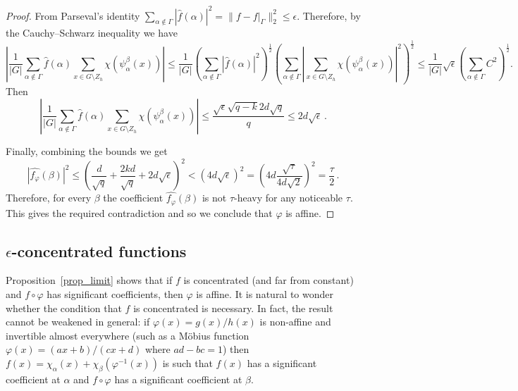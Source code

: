 \documentclass[11pt]{article}
\theoremstyle{definition}
\begin{document}
\begin{proof}
    From Parseval's identity $\sum_{\alpha \notin \Gamma} \left| \widehat{f}(\alpha) \right|^2 = \|f - f|_\Gamma \|_{2}^{2} \leq \epsilon$. Therefore, by the Cauchy--Schwarz inequality we have
    \[
        \left| \frac{1}{|G|} \sum_{\alpha \notin \Gamma} \widehat{f}(\alpha) \sum_{x \in G \setminus Z_h} \chi(\psi^\beta_\alpha(x)) \right|
        \leq
        \frac{1}{|G|} \left( \sum_{\alpha \notin \Gamma} \left| \widehat{f}(\alpha) \right|^2 \right)^\frac{1}{2} \left( \sum_{\alpha \notin \Gamma} \left| \sum_{x \in G \setminus Z_h} \chi(\psi^\beta_\alpha(x)) \right|^2 \right)^\frac{1}{2} \leq \frac{1}{|G|} \sqrt{\epsilon} \left(\sum_{\alpha \notin \Gamma} C^2  \right)^\frac{1}{2} .
    \]
    Then
    \[\left| \frac{1}{|G|} \sum_{\alpha \notin \Gamma} \widehat{f}(\alpha) \sum_{x \in G \setminus Z_h} \chi(\psi^\beta_\alpha(x)) \right| \leq \frac{\sqrt{\epsilon} \sqrt{q-k} 2 d \sqrt{q}}{q} \leq 2 d \sqrt{\epsilon} \,. \]

    Finally, combining the bounds we get
    \[ \left| \widehat{f_\varphi}(\beta) \right|^2 \leq \left(\frac{d}{\sqrt{q}} + \frac{2kd}{\sqrt{q}} + 2 d \sqrt{\epsilon}\right)^2 < \left(4 d \sqrt{\epsilon}\right)^2 = \left(4d \frac{\sqrt{\tau}}{4 d \sqrt{2}}\right)^2 = \frac{\tau}{2} \, . \]
    Therefore, for every $\beta$ the coefficient $\widehat{f_\varphi}(\beta)$ is not $\tau$-heavy for any noticeable $\tau$. %
    This gives the required contradiction and so we conclude that
    $\varphi$ is affine.
\end{proof}


\subsection{$\epsilon$-concentrated functions}\label{sec:e-concentrated}

Proposition~\ref{prop_limit} shows that if $f$ is concentrated (and far from constant) and $f \circ \varphi$ has significant coefficients, then $\varphi$ is affine.
It is natural to wonder whether the condition that $f$ is concentrated is necessary.
In fact, the result cannot be weakened in general: if $\varphi(x) = g(x)/h(x)$ is non-affine and invertible almost everywhere (such as a M{\" o}bius function $\varphi(x) = (ax + b)/(cx + d)$ where $ad - bc = 1$) then $f(x) = \chi_\alpha(x) + \chi_\beta(\varphi^{-1}(x))$ is such that $f(x)$ has a significant coefficient at $\alpha$ and $f \circ \varphi$ has a significant coefficient at $\beta$.
\end{document}
